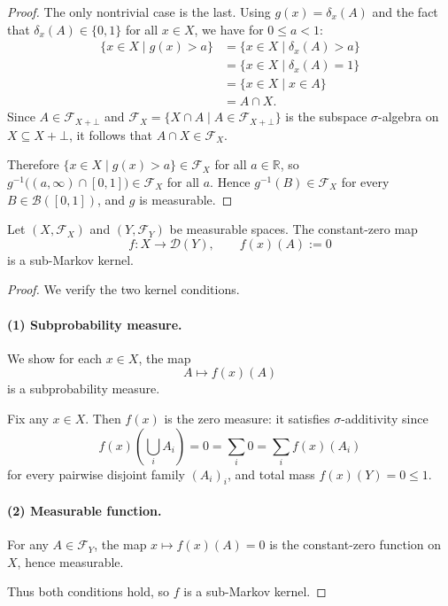 \begin{proof}
	The only nontrivial case is the last. Using $g(x)=\delta_x(A)$ and the fact that
	$\delta_x(A)\in\{0,1\}$ for all $x\in X$, we have for $0\le a<1$:
	\begin{align*}
		\{x \in X \mid g(x) > a \}
		&= \{x \in X \mid \delta_x(A) > a \} \\
		&= \{x \in X \mid \delta_x(A) = 1 \} \\
		&= \{x \in X \mid x \in A\} \\
		&= A \cap X.
	\end{align*}
	Since $A\in \mathcal{F}_{X+\bot}$ and $\mathcal{F}_X = \{X \cap A \mid A \in \mathcal{F}_{X+\bot}\}$ is the subspace $\sigma$-algebra
	on $X\subseteq X+\bot$, it follows that $A\cap X \in \mathcal{F}_X$.

	Therefore $\{x\in X \mid g(x)>a\}\in\mathcal{F}_X$ for all $a\in\mathbb{R}$, so
	$g^{-1}\big((a,\infty)\cap[0,1]\big)\in\mathcal{F}_X$ for all $a$.
	Hence $g^{-1}(B)\in\mathcal{F}_X$ for every $B\in\mathcal{B}([0,1])$, and $g$ is measurable.
\end{proof}

\begin{lemma}\label{lem:zero-kernel}
    Let $(X, \mathcal{F}_X)$ and $(Y, \mathcal{F}_Y)$ be measurable spaces. The constant-zero map
    \[
        f : X \to \mathcal{D}(Y), \qquad f(x)(A) := 0
    \]
    is a sub-Markov kernel.
\end{lemma}

\begin{proof}
    We verify the two kernel conditions.

    \paragraph{(1) Subprobability measure.}
	We show for each $x \in X$, the map
	\[
		A \mapsto f(x)(A)
	\]
	is a subprobability measure.

    Fix any $x \in X$. Then $f(x)$ is the zero measure: it satisfies 
    $\sigma$-additivity since
    \[
        f(x)\!\left(\bigcup_{i} A_i\right)
        = 0 = \sum_i 0
        = \sum_i f(x)(A_i)
    \]
    for every pairwise disjoint family $(A_i)_i$, and total mass 
    $f(x)(Y) = 0 \le 1$.

    \paragraph{(2) Measurable function.}
    For any $A \in \mathcal{F}_Y$, the map $x \mapsto f(x)(A) = 0$ is the 
    constant-zero function on $X$, hence measurable.

    Thus both conditions hold, so $f$ is a sub-Markov kernel.
\end{proof}

